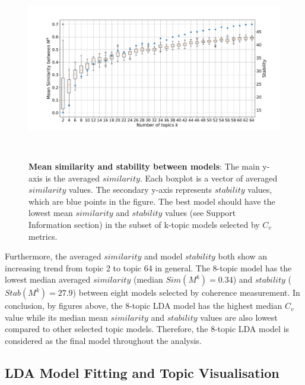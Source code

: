 \begin{figure}[H]
    \centering
    \includegraphics[width = 16cm, height = 8cm]{Code/img/jsd_boxplot.pdf}
    \caption[Mean similarity and stability between models]{\textbf{Mean similarity and stability between models}: The main y-axis is the averaged $similarity$. Each boxplot is a vector of averaged $similarity$ values. The secondary y-axis represents $stability$ values, which are blue points in the figure. The best model should have the lowest mean $similarity$ and $stability$ values (see Support Information section) in the subset of k-topic models selected by $C_v$ metrics.}
\end{figure}

Furthermore, the averaged $similarity$ and model $stability$ both show an increasing trend from topic 2 to topic 64 in general. The 8-topic model has the lowest median averaged $similarity$ (median $Sim(M^k) = 0.34$) and $stability$ ($Stab(M^k) = 27.9$) between eight models selected by coherence measurement. In conclusion, by figures above, the 8-topic LDA model has the highest median $C_v$ value while its median mean $similarity$ and $stability$ values are also lowest compared to other selected topic models. Therefore, the 8-topic LDA model is considered as the final model throughout the analysis.

\subsection{LDA Model Fitting and Topic Visualisation}

